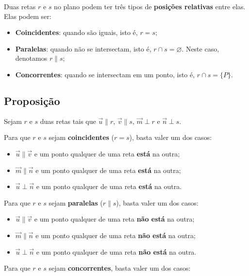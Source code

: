 \documentclass[
  brazilian,
  letterpaper,
  DIV=11,
  numbers=noendperiod]{scrreprt}
\providecommand{\tightlist}{%
  \setlength{\itemsep}{0pt}\setlength{\parskip}{0pt}}
\theoremstyle{definition}
\theoremstyle{plain}
\theoremstyle{definition}
\theoremstyle{remark}
\begin{document}
Duas retas \(r\) e \(s\) no plano podem ter três tipos de
\textbf{posições relativas} entre elas. Elas podem ser:

\begin{itemize}
\tightlist
\item
  \textbf{Coincidentes}: quando são iguais, isto é, \(r=s;\)
\item
  \textbf{Paralelas}: quando não se intersectam, isto é,
  \(r\cap s=\varnothing.\) Neste caso, denotamos \(r\parallel s;\)
\item
  \textbf{Concorrentes}: quando se intersectam em um ponto, isto é,
  \(r\cap s=\{P\}.\)
\end{itemize}

\subsection{Proposição}\label{proposiuxe7uxe3o-13}

Sejam \(r\) e \(s\) duas retas tais que \(\vec{u}\parallel r\),
\(\vec{v}\parallel s\), \(\vec{m}\perp r\) e \(\vec{n}\perp s\).

Para que \(r\) e \(s\) sejam \textbf{coincidentes} (\(r=s\)), basta
valer um dos casos:

\begin{itemize}
\tightlist
\item
  \(\vec{u}\parallel\vec{v}\) e um ponto qualquer de uma reta
  \textbf{está} na outra;
\item
  \(\vec{m}\parallel\vec{n}\) e um ponto qualquer de uma reta
  \textbf{está} na outra;
\item
  \(\vec{u}\perp\vec{n}\) e um ponto qualquer de uma reta \textbf{está}
  na outra.
\end{itemize}

Para que \(r\) e \(s\) sejam \textbf{paralelas} (\(r\parallel s\)),
basta valer um dos casos:

\begin{itemize}
\tightlist
\item
  \(\vec{u}\parallel\vec{v}\) e um ponto qualquer de uma reta
  \textbf{não está} na outra;
\item
  \(\vec{m}\parallel\vec{n}\) e um ponto qualquer de uma reta
  \textbf{não está} na outra;
\item
  \(\vec{u}\perp\vec{n}\) e um ponto qualquer de uma reta \textbf{não
  está} na outra.
\end{itemize}

Para que \(r\) e \(s\) sejam \textbf{concorrentes}, basta valer um dos
casos:
\end{document}
